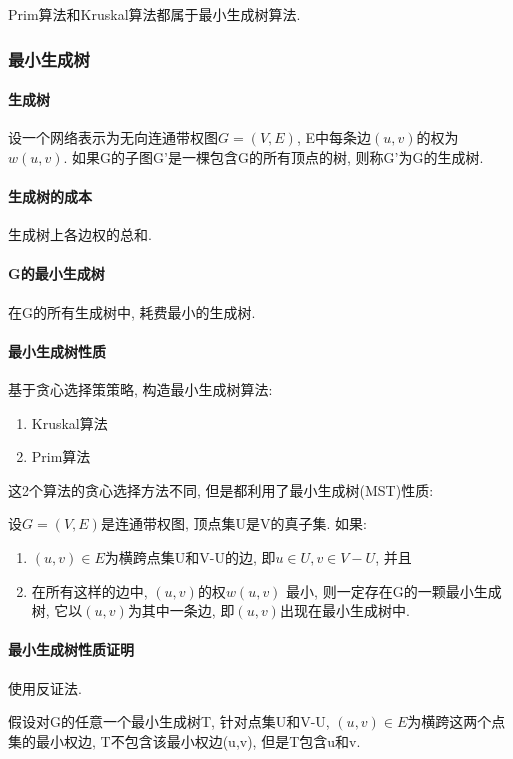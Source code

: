 Prim算法和Kruskal算法都属于最小生成树算法.
\subsubsection{最小生成树}
\label{sub:MST}
\paragraph*{生成树} 设一个网络表示为无向连通带权图$G=(V, E)$, E中每条边$(u,
	v)$的权为$w(u, v)$. 如果G的子图G'是一棵包含G的所有顶点的树,
则称G'为G的生成树.\par

\paragraph*{生成树的成本} 生成树上各边权的总和.\par

\paragraph*{G的最小生成树} 在G的所有生成树中, 耗费最小的生成树.

\paragraph{最小生成树性质}
基于贪心选择策策略, 构造最小生成树算法:
\begin{enumerate}
	\item Kruskal算法
	\item Prim算法
\end{enumerate}

这2个算法的贪心选择方法不同, 但是都利用了最小生成树(MST)性质:\par
设$G=(V, E)$是连通带权图, 顶点集U是V的真子集. 如果:
\begin{enumerate}
	\item $(u,v)\in E$为横跨点集U和V-U的边, 即$u\in U, v\in V-U$, 并且
	\item 在所有这样的边中, $(u, v)$的权$w(u, v)$ 最小,
	      则一定存在G的一颗最小生成树, 它以$(u, v)$为其中一条边, 即$(u,
		      v)$出现在最小生成树中.
\end{enumerate}

\paragraph{最小生成树性质证明}
使用反证法.\par
假设对G的任意一个最小生成树T, 针对点集U和V-U, $(u,v)\in
	E$为横跨这两个点集的最小权边, T不包含该最小权边(u,v), 但是T包含u和v.\par

